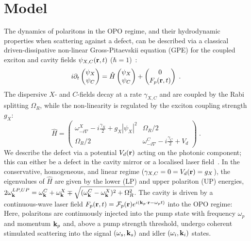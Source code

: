 \section{Model}
%
The dynamics of polaritons in the OPO regime, and their hydrodynamic
properties when scattering against a defect, can be described via a
classical driven-dissipative non-linear Gross-Pitaevskii equation
(GPE) for the coupled exciton and cavity fields $\psi_{X,C}
(\mathbf{r},t)$ ($\hbar=1$)~\cite{Whittaker_2005,Carusotto_2013}:
%
\begin{equation}
  i\partial_t \begin{pmatrix} \psi_X \\ \psi_C \end{pmatrix} =
  \hat{H} \begin{pmatrix} \psi_X \\ \psi_C \end{pmatrix}
  + \begin{pmatrix} 0 \\ F_p(\mathbf{r},t) \end{pmatrix} \; .
\label{eq:gpequ}
\end{equation}
%
The dispersive $X$- and $C$-fields decay at a rate $\gamma_{X,C}$ and
are coupled by the Rabi splitting $\Omega_R$, while the non-linearity
is regulated by the exciton coupling strength $g_X$:
%
\begin{equation}
  \hat{H} = \begin{pmatrix} \omega^{X}_{-i\nabla} - i
    \frac{\gamma_X}{2} + g_X |\psi_X|^2 & \Omega_R/2 \\ \Omega_R/2 &
    \omega^C_{-i\nabla} - i \frac{\gamma_C}{2} + V_d \end{pmatrix} \;
  .
\end{equation}
%
We describe the defect via a potential $V_d (\mathbf{r})$ acting on the
photonic component; this can either be a defect in the cavity mirror
or a localised laser field~\cite{Amo_2009,Amo_2010,Zajac_2012}.
%
In the conservative, homogeneous, and linear regime ($\gamma_{X,C}=0=
V_d (\mathbf{r})= g_X$), the eigenvalues of $\hat{H}$ are given by the
lower (LP) and upper polariton (UP) energies, $2
\omega_{\mathbf{k}}^{LP,UP} = \omega_{\mathbf{k}}^{C} +
\omega_{\mathbf{k}}^{X} \mp \sqrt{(\omega_{\mathbf{k}}^{C} -
  \omega_{\mathbf{k}}^{X})^2 + \Omega_R^2}$.
%
The cavity is driven by a continuous-wave laser field $F_p(\mathbf{r},t)
= \mathcal{F}_p(\mathbf{r}) e^{i (\mathbf{k}_p \cdot \mathbf{r} - \omega_p
  t)}$ into the OPO regime: Here, polaritons are continuously injected
into the pump state with frequency $\omega_p$ and momentum
$\mathbf{k}_p$ and, above a pump strength threshold, undergo coherent
stimulated scattering into the signal $(\omega_s, \mathbf{k}_s)$ and
idler $(\omega_i, \mathbf{k}_i)$ states. 

